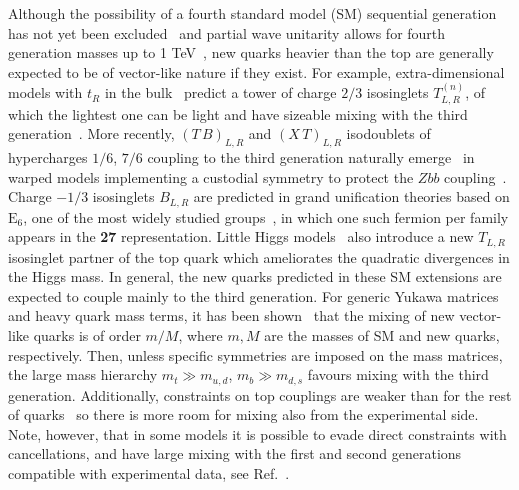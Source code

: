 \documentclass[12pt,a4paper]{article}
\newcommand{\Esix}{\text{E}_6}
\newcommand{\TB}{(T \, B)}
\newcommand{\XT}{(X \, T)}
\begin{document}
Although the possibility of a fourth standard model (SM) sequential generation has not yet been excluded~\cite{Alwall:2006bx,Kribs:2007nz,Holdom:2009rf} and partial wave unitarity allows for fourth generation masses up to 1 TeV~\cite{Chanowitz:1978mv},
new quarks heavier than the top are generally expected to be of vector-like nature if they exist. For example, extra-dimensional models with $t_R$ in the bulk~\cite{Mirabelli:1999ks,Chang:1999nh,Csaki:2004ay} predict a tower of charge $2/3$ isosinglets $T_{L,R}^{(n)}$, of which the lightest one can be light and have sizeable mixing with the third generation~\cite{delAguila:2000kb}. More recently, $\TB_{L,R}$ and $\XT_{L,R}$ isodoublets of hypercharges $1/6$, $7/6$ coupling to the third generation naturally emerge~\cite{Contino:2006qr,Carena:2006bn} in warped models implementing a custodial symmetry to protect the $Zbb$ coupling~\cite{Agashe:2006at}. Charge $-1/3$ isosinglets $B_{L,R}$ are predicted in grand unification theories based on $\Esix$, one of the most widely studied groups~\cite{Frampton:1999xi,Hewett:1988xc}, in which one such fermion per family appears in the {\bf 27} representation. 
Little Higgs models~\cite{ArkaniHamed:2001nc,ArkaniHamed:2002qy,Perelstein:2005ka} also 
introduce a new $T_{L,R}$ isosinglet partner of the top quark which ameliorates the quadratic divergences in the Higgs mass. 
In general, the new quarks predicted in these SM extensions are expected to couple mainly to the third generation. For generic Yukawa matrices and heavy quark mass terms, it has been shown~\cite{delAguila:1982fs} that the mixing of new vector-like quarks is of order $m/M$, where $m,M$ are the masses of SM and new quarks, respectively. Then, unless specific symmetries are imposed on the mass matrices,
the large mass hierarchy $m_t \gg m_{u,d}$, $m_b \gg m_{d,s}$ favours mixing with the third generation. Additionally, constraints on top couplings are weaker than for the rest of quarks~\cite{delAguila:1998tp,AguilarSaavedra:2002kr} so there is more room for mixing also from the experimental side. Note, however, that in some models it is possible to evade direct constraints with cancellations, and have large mixing with the first and second generations compatible with experimental data, see Ref.~\cite{Atre:2008iu}.
\end{document}
